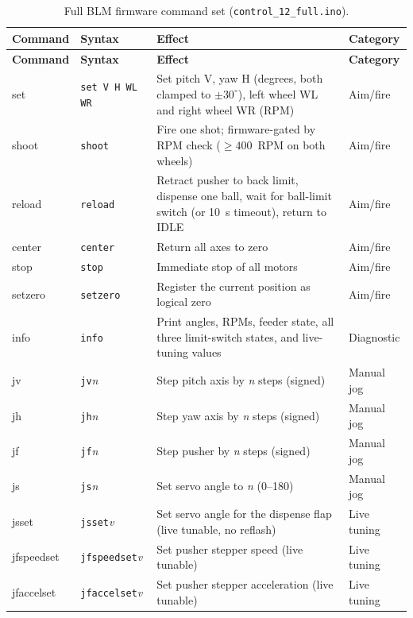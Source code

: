 {\footnotesize
\begin{longtable}{|l|l|p{6cm}|p{2cm}|}
\caption{Full BLM firmware command set (\texttt{control\_12\_full.ino}).} \label{tab:app_g_commands} \\
\hline
\textbf{Command} & \textbf{Syntax} & \textbf{Effect} & \textbf{Category} \\
\hline
\endfirsthead
\hline
\textbf{Command} & \textbf{Syntax} & \textbf{Effect} & \textbf{Category} \\
\hline
\endhead
\hline
\endfoot
set     & \texttt{set V H WL WR}  & Set pitch V, yaw H (degrees, both clamped to $\pm30^\circ$), left wheel WL and right wheel WR (RPM) & Aim/fire \\ \hline
shoot   & \texttt{shoot}          & Fire one shot; firmware-gated by RPM check ($\geq 400$~RPM on both wheels) & Aim/fire \\ \hline
reload  & \texttt{reload}         & Retract pusher to back limit, dispense one ball, wait for ball-limit switch (or 10~s timeout), return to IDLE & Aim/fire \\ \hline
center  & \texttt{center}         & Return all axes to zero & Aim/fire \\ \hline
stop    & \texttt{stop}           & Immediate stop of all motors & Aim/fire \\ \hline
setzero & \texttt{setzero}        & Register the current position as logical zero & Aim/fire \\ \hline
info    & \texttt{info}           & Print angles, RPMs, feeder state, all three limit-switch states, and live-tuning values & Diagnostic \\ \hline
jv      & \texttt{jv}\textit{n}   & Step pitch axis by \textit{n} steps (signed) & Manual jog \\ \hline
jh      & \texttt{jh}\textit{n}   & Step yaw axis by \textit{n} steps (signed) & Manual jog \\ \hline
jf      & \texttt{jf}\textit{n}   & Step pusher by \textit{n} steps (signed) & Manual jog \\ \hline
js      & \texttt{js}\textit{n}   & Set servo angle to \textit{n} (0--180) & Manual jog \\ \hline
jsset       & \texttt{jsset}\textit{v}      & Set servo angle for the dispense flap (live tunable, no reflash) & Live tuning \\ \hline
jfspeedset  & \texttt{jfspeedset}\textit{v} & Set pusher stepper speed (live tunable) & Live tuning \\ \hline
jfaccelset  & \texttt{jfaccelset}\textit{v} & Set pusher stepper acceleration (live tunable) & Live tuning \\ \hline
\end{longtable}
}

